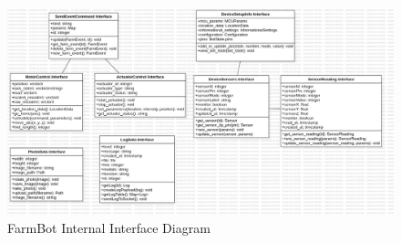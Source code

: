 \begin{figure}[H]
    \centering
    \includegraphics[width=1\textwidth]{Figures/Internal_Interface_Diagram.png}
    \caption{FarmBot Internal Interface Diagram}\label{fig:InternalInterfaceDiagram}
\end{figure}

